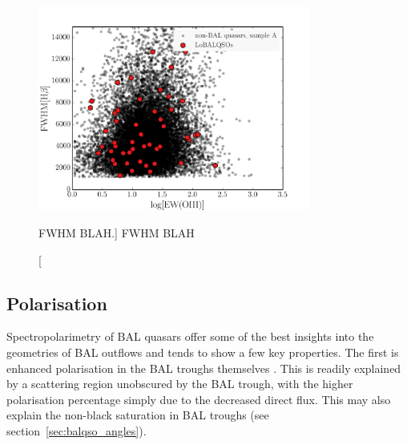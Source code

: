 \begin{figure}
\centering
\includegraphics[width=0.8\textwidth]{figures/ewpaper/fw_v_ew.png}
\caption
[FWHM BLAH.]
{
FWHM BLAH
}
\label{fig:bal_ev1_bins}
\end{figure}


\subsection{Polarisation}

Spectropolarimetry of BAL quasars offer some of
the best insights into the geometries of BAL outflows and 
tends to show a few key properties. The first is enhanced 
polarisation in the BAL troughs themselves \citep{schmidt1999}. 
This is readily explained by a scattering region unobscured by the
BAL trough, with the higher polarisation percentage simply due to the
decreased direct flux. This may also explain the non-black saturation in
BAL troughs (see section~\ref{sec:balqso_angles}).

